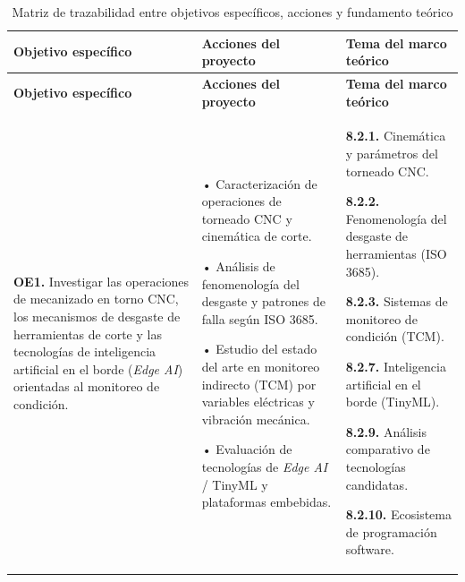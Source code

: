 {\footnotesize
{}
\setlength{\parskip}{1.5pt}
\setlength{\tabcolsep}{4.0pt}
\begin{longtable}{|>{\raggedright\arraybackslash}p{3.3cm}|>{\raggedright\arraybackslash}p{5.2cm}|>{\raggedright\arraybackslash}p{5.2cm}|}
\caption{Matriz de trazabilidad entre objetivos específicos, acciones y fundamento teórico\label{tab:contenido_tematico}}
\\
\hline
\textbf{Objetivo específico} & \textbf{Acciones del proyecto} & \textbf{Tema del marco teórico} \\
\hline \hline
\endfirsthead

\hline
\textbf{Objetivo específico} & \textbf{Acciones del proyecto} & \textbf{Tema del marco teórico} \\
\hline \hline
\endhead

\hline
\endfoot

\hline
\multicolumn{3}{c}{\textbf{Fuente:} Elaboración propia, 2026.}
\endlastfoot

\textbf{OE1.} Investigar las operaciones de mecanizado en torno CNC, los mecanismos de desgaste de herramientas de corte y las tecnologías de inteligencia artificial en el borde (\textit{Edge AI}) orientadas al monitoreo de condición. &
• Caracterización de operaciones de torneado CNC y cinemática de corte.\par\vspace{1mm}
• Análisis de fenomenología del desgaste y patrones de falla según ISO 3685.\par\vspace{1mm}
• Estudio del estado del arte en monitoreo indirecto (TCM) por variables eléctricas y vibración mecánica.\par\vspace{1mm}
• Evaluación de tecnologías de \textit{Edge AI} / TinyML y plataformas embebidas. &
\textbf{8.2.1.} Cinemática y parámetros del torneado CNC.\par\vspace{1mm}
\textbf{8.2.2.} Fenomenología del desgaste de herramientas (ISO 3685).\par\vspace{1mm}
\textbf{8.2.3.} Sistemas de monitoreo de condición (TCM).\par\vspace{1mm}
\textbf{8.2.7.} Inteligencia artificial en el borde (TinyML).\par\vspace{1mm}
\textbf{8.2.9.} Análisis comparativo de tecnologías candidatas.\par\vspace{1mm}
\textbf{8.2.10.} Ecosistema de programación software. \\ \hline


\end{longtable}}

